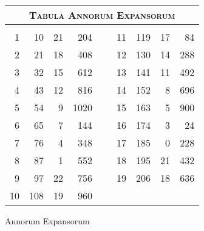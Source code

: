 %
\begin{tabnums} %
\normalsize
\centering
\setlength{\tabcolsep}{1.0ex}
%
\newcommand{\cwd}{3.2em}
\newcommand{\da}{{\scriptsize †}}
\newcommand{\db}{{\scriptsize ‡}}
\newcommand{\ang}{90}
\newcommand{\hsa}[1]{\scriptsize{#1}}
\newcommand{\hsb}[1]{\tiny{#1}}
\newcommand{\hdrA}{%
  ~ & ~ & \multicolumn{3}{c}{\hsa{Arabici}}
}
%
\newcommand{\hdrB}{%
  \ch{888}{\hsb{Anni Iuliani}}&
  \ch{888}{\hsb{Dies}} &
  \hsb{\ch{Horae}{Horae}} &
  \ch{8888}{\hsb{Scru\-puli}}
}
%
\newcommand{\hdrs}{%
 \hdrB & & \hdrB \\
 \cmidrule{1-4} \cmidrule{6-9}
}
%
\begin{tabular}[c]{@{} rrrr c rrrr @{}}
\toprule
\multicolumn{9}{c}{\Large\textsc{Tabula Annorum Expansorum}} \\
\toprule
\hdrs %
  1 &  10 &  21 &  204 &\hspace*{1em}
                         &  11 & 119 &  17 &  84 \\
  2 &  21 &  18 &  408 &~&  12 & 130 &  14 & 288 \\
  3 &  32 &  15 &  612 &~&  13 & 141 &  11 & 492 \\
  4 &  43 &  12 &  816 &~&  14 & 152 &   8 & 696 \\
  5 &  54 &   9 & 1020 &~&  15 & 163 &   5 & 900 \\
  6 &  65 &   7 &  144 &~&  16 & 174 &   3 &  24 \\
  7 &  76 &   4 &  348 &~&  17 & 185 &   0 & 228 \\
  8 &  87 &   1 &  552 &~&  18 & 195 &  21 & 432 \\
  9 &  97 &  22 &  756 &~&  19 & 206 &  18 & 636 \\
 10 & 108 &  19 &  960 &~&     &     &     &     \\
\bottomrule
\end{tabular}
\caption{Annorum Expansorum}
\label{tab:p141b}
\end{tabnums}

